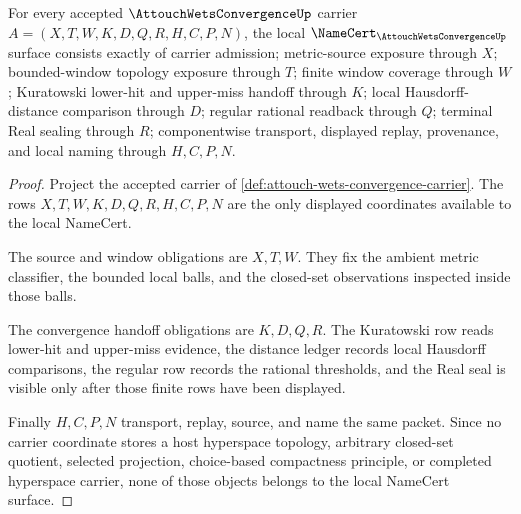 \begin{theorem}
\label{thm:attouch-wets-convergence-namecert-obligations}
For every accepted $\AttouchWetsConvergenceUp$ carrier $A=(X,T,W,K,D,Q,R,H,C,P,N)$, the local $\NameCert_{\AttouchWetsConvergenceUp}$ surface consists exactly of carrier admission; metric-source exposure through $X$; bounded-window topology exposure through $T$; finite window coverage through $W$; Kuratowski lower-hit and upper-miss handoff through $K$; local Hausdorff-distance comparison through $D$; regular rational readback through $Q$; terminal Real sealing through $R$; componentwise transport, displayed replay, provenance, and local naming through $H,C,P,N$.
\end{theorem}
\begin{proof}
Project the accepted carrier of \autoref{def:attouch-wets-convergence-carrier}. The rows $X,T,W,K,D,Q,R,H,C,P,N$ are the only displayed coordinates available to the local NameCert.

The source and window obligations are $X,T,W$. They fix the ambient metric classifier, the bounded local balls, and the closed-set observations inspected inside those balls.

The convergence handoff obligations are $K,D,Q,R$. The Kuratowski row reads lower-hit and upper-miss evidence, the distance ledger records local Hausdorff comparisons, the regular row records the rational thresholds, and the Real seal is visible only after those finite rows have been displayed.

Finally $H,C,P,N$ transport, replay, source, and name the same packet. Since no carrier coordinate stores a host hyperspace topology, arbitrary closed-set quotient, selected projection, choice-based compactness principle, or completed hyperspace carrier, none of those objects belongs to the local NameCert surface.
\end{proof}

